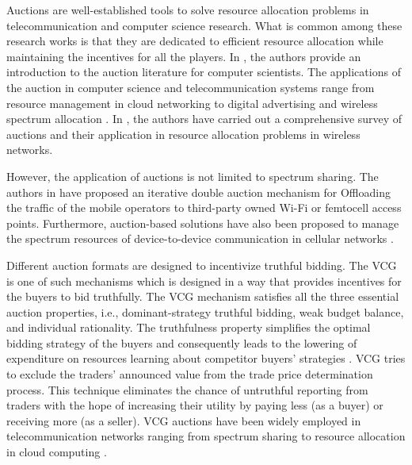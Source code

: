 Auctions are well-established tools to solve resource allocation problems in telecommunication and computer science research. What is common among these research works is that they are dedicated to efficient resource allocation while maintaining the incentives for all the players. In \cite{Parsons:2011:ABG:1883612.1883617}, the authors provide an introduction to the auction literature for computer scientists. The applications of the auction in computer science and telecommunication systems range from resource management in cloud networking \cite{7807328} to digital advertising \cite{7390161} and wireless spectrum allocation \cite{6365159}.
In \cite{6365159}, the authors have carried out a comprehensive survey of auctions and their application in resource allocation problems in wireless networks.


However, the application of auctions is not limited to spectrum sharing. The authors in \cite{6894640} have proposed an iterative double auction mechanism for Offloading the traffic of the mobile operators to third-party owned Wi-Fi or femtocell access points. Furthermore, auction-based solutions have also been proposed to manage the spectrum resources of device-to-device communication in cellular networks \cite{7286856}.

Different auction formats are designed to incentivize truthful bidding. The \ac{VCG} \cite{Vickrey} is one of such mechanisms which is designed in a way that provides incentives for the buyers to bid truthfully. The \ac{VCG} mechanism satisfies all the three essential auction properties, i.e., dominant-strategy truthful bidding, weak budget balance, and individual rationality. The truthfulness property simplifies the optimal bidding strategy of the buyers and consequently leads to the lowering of expenditure on resources learning about competitor buyers' strategies \cite{Ausubel06thelovely}.
\ac{VCG} tries to exclude the traders' announced value from the trade price determination process. This technique eliminates the chance of untruthful reporting from traders with the hope of increasing their utility by paying less (as a buyer) or receiving more (as a seller).
\ac{VCG} auctions have been widely employed in telecommunication networks ranging from spectrum sharing \cite{7842378} to resource allocation in cloud computing \cite{7933203}. 

